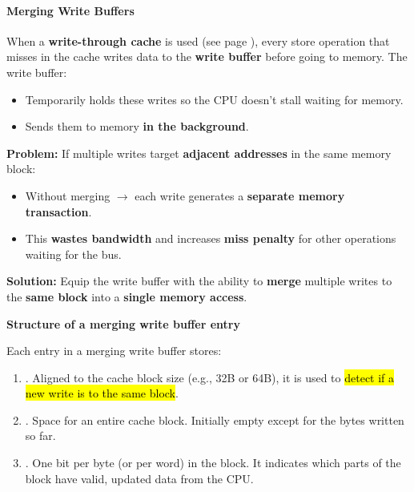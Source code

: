 \paragraph{Merging Write Buffers}

When a \textbf{write-through cache} is used (see page ), every store operation that misses in the cache writes data to the \textbf{write buffer} before going to memory. The write buffer:
\begin{itemize}
    \item Temporarily holds these writes so the CPU doesn't stall waiting for memory.
    \item Sends them to memory \textbf{in the background}.
\end{itemize}
\textcolor{Red2}{ \textbf{Problem:}} If multiple writes target \textbf{adjacent addresses} in the same memory block:
\begin{itemize}
    \item Without merging $\rightarrow$ each write generates a \textbf{separate memory transaction}.
    \item This \textbf{wastes bandwidth} and increases \textbf{miss penalty} for other operations waiting for the bus.
\end{itemize}
\textcolor{Green3}{ \textbf{Solution:}} Equip the write buffer with the ability to \textbf{merge} multiple writes to the \textbf{same block} into a \textbf{single memory access}.

\highspace
\begin{flushleft}
    \textcolor{Green3}{ \textbf{Structure of a merging write buffer entry}}
\end{flushleft}
Each entry in a merging write buffer stores:
\begin{enumerate}
    \item {}. Aligned to the cache block size (e.g., 32B or 64B), it is used to \hl{detect if a new write is to the same block}.
    \item {}. Space for an entire cache block. Initially empty except for the bytes written so far.
    \item {}. One bit per byte (or per word) in the block. It indicates which parts of the block have valid, updated data from the CPU.
\end{enumerate}

